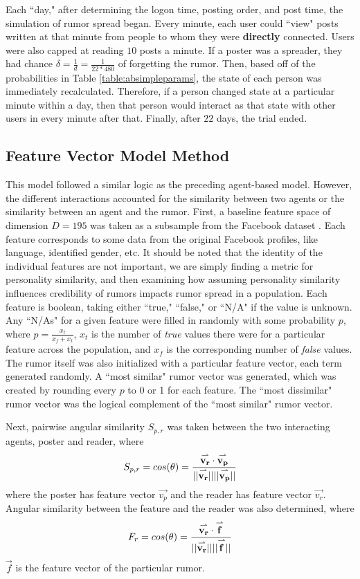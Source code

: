 Each ``day," after determining the logon time, posting order, and post time, the simulation of rumor spread began. Every minute, each user could ``view" posts written at that minute from people to whom they were \textbf{directly} connected. Users were also capped at reading $ 10 $ posts a minute. If a poster was a spreader, they had chance $ \delta = \frac{1}{d} = \frac{1}{22*480} $ of forgetting the rumor. Then, based off of the probabilities in Table \ref{table:absimpleparams}, the state of each person was immediately recalculated. Therefore, if a person changed state at a particular minute within a day, then that person would interact as that state with other users in every minute after that. Finally, after $ 22 $ days, the trial ended.

\subsection{Feature Vector Model Method}
\label{subsec:fvmodelsetup}

This model followed a similar logic as the preceding agent-based model. However, the different interactions accounted for the similarity between two agents or the similarity between an agent and the rumor. First, a baseline feature space of dimension $ D = 195 $ was taken as a subsample from the Facebook dataset \cite{mcauley-2014}. Each feature corresponds to some data from the original Facebook profiles, like language, identified gender, etc. It should be noted that the identity of the individual features are not important, we are simply finding a metric for personality similarity, and then examining how assuming personality similarity influences credibility of rumors impacts rumor spread in a population. Each feature is boolean, taking either ``true," ``false," or ``N/A" if the value is unknown. Any ``N/As" for a given feature were filled in randomly with some probability $ p $, where $ p = \frac{x_{t}}{x_{f} + x_{t}} $, $ x_{t} $ is the number of \textit{true} values there were for a particular feature across the population, and $ x_{f} $ is the corresponding number of \textit{false} values. The rumor itself was also initialized with a particular feature vector, each term generated randomly. A ``most similar" rumor vector was generated, which was created by rounding every $ p $ to 0 or 1 for each feature. The ``most dissimilar" rumor vector was the logical complement of the ``most similar" rumor vector. 

Next, pairwise angular similarity $ S_{p,r} $ was taken between the two interacting agents, poster and reader, where 
$$ S_{p,r} = cos(\theta) = \frac{\overset{\rightharpoonup}{\mathbf{v_r}}\cdot\overset{\rightharpoonup}{\mathbf{v_p}}}{\lvert\lvert \overset{\rightharpoonup}{\mathbf{v_r}} \rvert\rvert \lvert\lvert \overset{\rightharpoonup}{\mathbf{v_p}} \rvert\rvert} $$ where the poster has feature vector $ \vec{v_p} $ and the reader has feature vector $ \vec{v_r} $. Angular similarity between the feature and the reader was also determined, where $$ F_r  = cos(\theta) = \frac{\overset{\rightharpoonup}{\mathbf{v_r}}\cdot\overset{\rightharpoonup}{\mathbf{f}}}{\lvert\lvert \overset{\rightharpoonup}{\mathbf{v_r}} \rvert\rvert \lvert\lvert \overset{\rightharpoonup}{\mathbf{f}} \rvert\rvert} $$ $ \vec{f} $ is the feature vector of the particular rumor.

